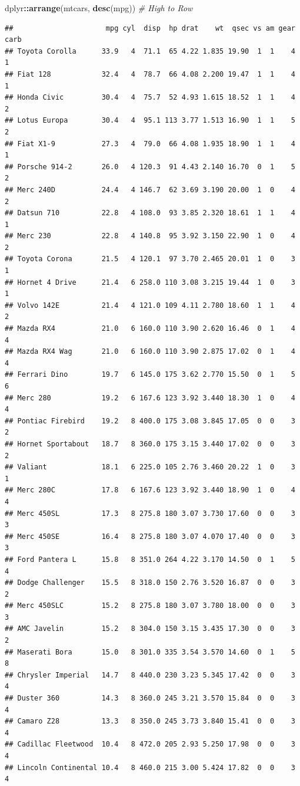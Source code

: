 \documentclass[
]{book}
\newenvironment{Shaded}{\begin{snugshade}}{\end{snugshade}}
\newcommand{\CommentTok}[1]{\textcolor[rgb]{0.56,0.35,0.01}{\textit{#1}}}
\newcommand{\FunctionTok}[1]{\textcolor[rgb]{0.13,0.29,0.53}{\textbf{#1}}}
\newcommand{\NormalTok}[1]{#1}
\newcommand{\SpecialCharTok}[1]{\textcolor[rgb]{0.81,0.36,0.00}{\textbf{#1}}}
\begin{document}
\begin{Shaded}
\begin{Highlighting}[]
\NormalTok{dplyr}\SpecialCharTok{::}\FunctionTok{arrange}\NormalTok{(mtcars, }\FunctionTok{desc}\NormalTok{(mpg)) }\CommentTok{\# High to Row}
\end{Highlighting}
\end{Shaded}

\begin{verbatim}
##                      mpg cyl  disp  hp drat    wt  qsec vs am gear carb
## Toyota Corolla      33.9   4  71.1  65 4.22 1.835 19.90  1  1    4    1
## Fiat 128            32.4   4  78.7  66 4.08 2.200 19.47  1  1    4    1
## Honda Civic         30.4   4  75.7  52 4.93 1.615 18.52  1  1    4    2
## Lotus Europa        30.4   4  95.1 113 3.77 1.513 16.90  1  1    5    2
## Fiat X1-9           27.3   4  79.0  66 4.08 1.935 18.90  1  1    4    1
## Porsche 914-2       26.0   4 120.3  91 4.43 2.140 16.70  0  1    5    2
## Merc 240D           24.4   4 146.7  62 3.69 3.190 20.00  1  0    4    2
## Datsun 710          22.8   4 108.0  93 3.85 2.320 18.61  1  1    4    1
## Merc 230            22.8   4 140.8  95 3.92 3.150 22.90  1  0    4    2
## Toyota Corona       21.5   4 120.1  97 3.70 2.465 20.01  1  0    3    1
## Hornet 4 Drive      21.4   6 258.0 110 3.08 3.215 19.44  1  0    3    1
## Volvo 142E          21.4   4 121.0 109 4.11 2.780 18.60  1  1    4    2
## Mazda RX4           21.0   6 160.0 110 3.90 2.620 16.46  0  1    4    4
## Mazda RX4 Wag       21.0   6 160.0 110 3.90 2.875 17.02  0  1    4    4
## Ferrari Dino        19.7   6 145.0 175 3.62 2.770 15.50  0  1    5    6
## Merc 280            19.2   6 167.6 123 3.92 3.440 18.30  1  0    4    4
## Pontiac Firebird    19.2   8 400.0 175 3.08 3.845 17.05  0  0    3    2
## Hornet Sportabout   18.7   8 360.0 175 3.15 3.440 17.02  0  0    3    2
## Valiant             18.1   6 225.0 105 2.76 3.460 20.22  1  0    3    1
## Merc 280C           17.8   6 167.6 123 3.92 3.440 18.90  1  0    4    4
## Merc 450SL          17.3   8 275.8 180 3.07 3.730 17.60  0  0    3    3
## Merc 450SE          16.4   8 275.8 180 3.07 4.070 17.40  0  0    3    3
## Ford Pantera L      15.8   8 351.0 264 4.22 3.170 14.50  0  1    5    4
## Dodge Challenger    15.5   8 318.0 150 2.76 3.520 16.87  0  0    3    2
## Merc 450SLC         15.2   8 275.8 180 3.07 3.780 18.00  0  0    3    3
## AMC Javelin         15.2   8 304.0 150 3.15 3.435 17.30  0  0    3    2
## Maserati Bora       15.0   8 301.0 335 3.54 3.570 14.60  0  1    5    8
## Chrysler Imperial   14.7   8 440.0 230 3.23 5.345 17.42  0  0    3    4
## Duster 360          14.3   8 360.0 245 3.21 3.570 15.84  0  0    3    4
## Camaro Z28          13.3   8 350.0 245 3.73 3.840 15.41  0  0    3    4
## Cadillac Fleetwood  10.4   8 472.0 205 2.93 5.250 17.98  0  0    3    4
## Lincoln Continental 10.4   8 460.0 215 3.00 5.424 17.82  0  0    3    4
\end{verbatim}
\end{document}
